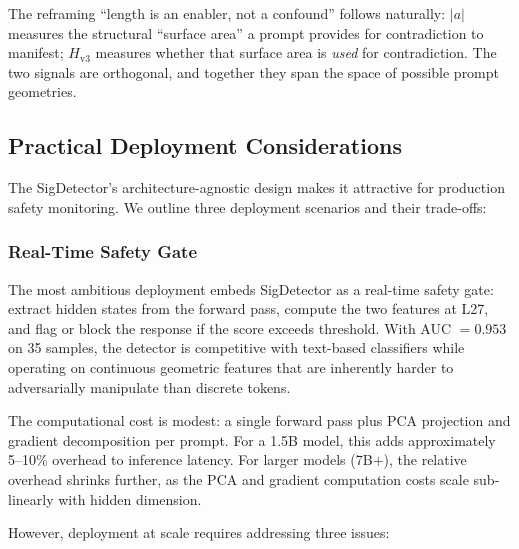 \documentclass[12pt,a4paper]{article}
\begin{document}
The reframing ``length is an enabler, not a confound'' follows naturally: $|a|$ measures the structural ``surface area'' a prompt provides for contradiction to manifest; $H_{\text{v3}}$ measures whether that surface area is \textit{used} for contradiction. The two signals are orthogonal, and together they span the space of possible prompt geometries.

\subsection{Practical Deployment Considerations}

The SigDetector's architecture-agnostic design makes it attractive for production safety monitoring. We outline three deployment scenarios and their trade-offs:

\subsubsection{Real-Time Safety Gate}

The most ambitious deployment embeds SigDetector as a real-time safety gate: extract hidden states from the forward pass, compute the two features at L27, and flag or block the response if the score exceeds threshold. With AUC $= 0.953$ on 35 samples, the detector is competitive with text-based classifiers while operating on continuous geometric features that are inherently harder to adversarially manipulate than discrete tokens.

The computational cost is modest: a single forward pass plus PCA projection and gradient decomposition per prompt. For a 1.5B model, this adds approximately 5--10\% overhead to inference latency. For larger models (7B+), the relative overhead shrinks further, as the PCA and gradient computation costs scale sub-linearly with hidden dimension.

However, deployment at scale requires addressing three issues:
\end{document}
